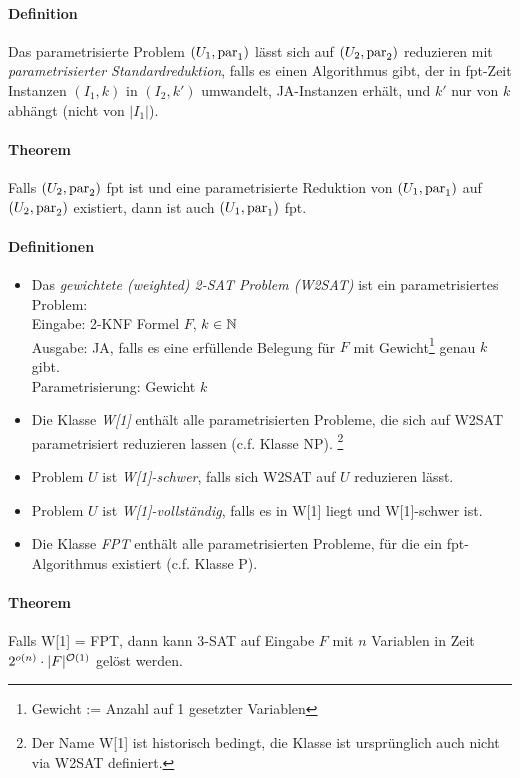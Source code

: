 \paragraph{Definition}
Das parametrisierte Problem $(U_1, \text{par}_1)$ lässt sich auf $(U_2, \text{par}_2)$ reduzieren mit
\emph{parametrisierter Standardreduktion}, falls es einen Algorithmus gibt, der in fpt-Zeit
Instanzen $(I_1, k)$ in $(I_2, k')$ umwandelt, JA-Instanzen erhält, und $k'$ nur von $k$ abhängt (nicht von $|I_1|$).

\paragraph{Theorem}
Falls $(U_2, \text{par}_2)$ fpt ist und eine parametrisierte Reduktion von $(U_1, \text{par}_1)$ auf $(U_2, \text{par}_2)$ existiert,
dann ist auch $(U_1, \text{par}_1)$ fpt.

\paragraph{Definitionen}
\begin{itemize}
    \item Das \emph{gewichtete (weighted) 2-SAT Problem (W2SAT)} ist ein parametrisiertes Problem: \\
    Eingabe: 2-KNF Formel $F$, $k \in \mathbb{N}$ \\
    Ausgabe: JA, falls es eine erfüllende Belegung für $F$ mit Gewicht\footnote{Gewicht := Anzahl auf
    1 gesetzter Variablen} genau $k$ gibt. \\
    Parametrisierung: Gewicht $k$
    \item Die Klasse \emph{W[1]} enthält alle parametrisierten Probleme, die sich auf W2SAT parametrisiert
    reduzieren lassen (c.f. Klasse NP).%
    \footnote{Der Name W[1] ist historisch bedingt, die Klasse ist ursprünglich auch nicht via W2SAT definiert.}
    \item Problem $U$ ist \emph{W[1]-schwer}, falls sich W2SAT auf $U$ reduzieren lässt.
    \item Problem $U$ ist \emph{W[1]-vollständig}, falls es in W[1] liegt und W[1]-schwer ist.
    \item Die Klasse \emph{FPT} enthält alle parametrisierten Probleme, für die ein fpt-Algorithmus existiert (c.f. Klasse P).
\end{itemize}

\paragraph{Theorem}
Falls W[1] = FPT, dann kann 3-SAT auf Eingabe $F$ mit $n$ Variablen in Zeit $2^{o(n)} \cdot |F|^{\mathcal{O}(1)}$
gelöst werden.

